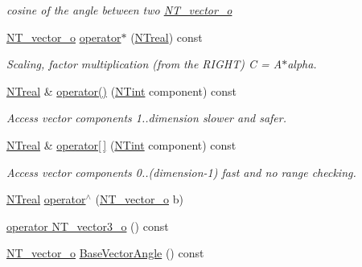 \begin{DoxyCompactItemize}
\begin{DoxyCompactList}\small\item\em cosine of the angle between two \hyperlink{class_n_t__vector__o}{NT\_\-vector\_\-o} \item\end{DoxyCompactList}\item 
\hyperlink{class_n_t__vector__o}{NT\_\-vector\_\-o} \hyperlink{class_n_t__vector__o_a8ad5180e3926fcf6b47d19e9b6039b90}{operator$\ast$} (\hyperlink{nt__types_8h_a814a97893e9deb1eedcc7604529ba80d}{NTreal}) const 
\begin{DoxyCompactList}\small\item\em Scaling, factor multiplication (from the RIGHT) C = A$\ast$alpha. \item\end{DoxyCompactList}\item 
\hyperlink{nt__types_8h_a814a97893e9deb1eedcc7604529ba80d}{NTreal} \& \hyperlink{class_n_t__vector__o_ae63b40e0e876f347c81f71ef18e2025c}{operator()} (\hyperlink{nt__types_8h_aee8aa0a9869e8b5c97c6c02217ff09cd}{NTint} component) const 
\begin{DoxyCompactList}\small\item\em Access vector components 1..dimension slower and safer. \item\end{DoxyCompactList}\item 
\hyperlink{nt__types_8h_a814a97893e9deb1eedcc7604529ba80d}{NTreal} \& \hyperlink{class_n_t__vector__o_a07954f5d0be145a28d3aa3b7715edfea}{operator\mbox{[}$\,$\mbox{]}} (\hyperlink{nt__types_8h_aee8aa0a9869e8b5c97c6c02217ff09cd}{NTint} component) const 
\begin{DoxyCompactList}\small\item\em Access vector components 0..(dimension-\/1) fast and no range checking. \item\end{DoxyCompactList}\item 
\hyperlink{nt__types_8h_a814a97893e9deb1eedcc7604529ba80d}{NTreal} \hyperlink{class_n_t__vector__o_a5806e914ac946e85732e2c9dbf7c5a9c}{operator$^\wedge$} (\hyperlink{class_n_t__vector__o}{NT\_\-vector\_\-o} b)
\item 
\hyperlink{class_n_t__vector__o_a49c73dda13baef8457dca04edc54f14c}{operator NT\_\-vector3\_\-o} () const 
\item 
\hyperlink{class_n_t__vector__o}{NT\_\-vector\_\-o} \hyperlink{class_n_t__vector__o_ae3f529b5a21fbb413d59b6484a12a419}{BaseVectorAngle} () const 

\end{DoxyCompactItemize}
